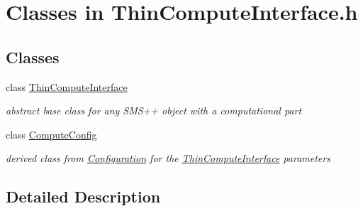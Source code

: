 \hypertarget{group___thin_compute_interface___c_l_a_s_s_e_s}{}\section{Classes in Thin\+Compute\+Interface.\+h}
\label{group___thin_compute_interface___c_l_a_s_s_e_s}
\subsection*{Classes}
\begin{DoxyCompactItemize}
\item 
class \mbox{\hyperlink{class_s_m_spp__di__unipi__it_1_1_thin_compute_interface}{Thin\+Compute\+Interface}}
\begin{DoxyCompactList}\small\item\em abstract base class for any S\+M\+S++ object with a computational part \end{DoxyCompactList}\item 
class \mbox{\hyperlink{class_s_m_spp__di__unipi__it_1_1_compute_config}{Compute\+Config}}
\begin{DoxyCompactList}\small\item\em derived class from \mbox{\hyperlink{class_s_m_spp__di__unipi__it_1_1_configuration}{Configuration}} for the \mbox{\hyperlink{class_s_m_spp__di__unipi__it_1_1_thin_compute_interface}{Thin\+Compute\+Interface}} parameters \end{DoxyCompactList}\end{DoxyCompactItemize}


\subsection{Detailed Description}
